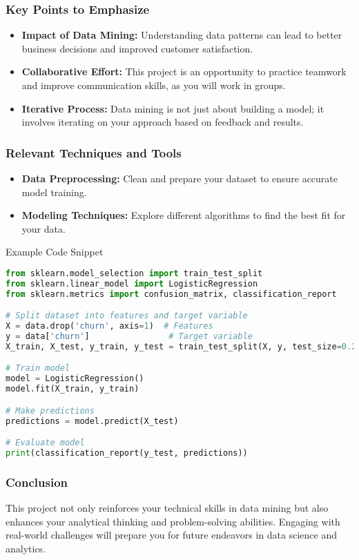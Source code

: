 \documentclass{beamer}
\begin{document}
\begin{frame}
    \frametitle{Key Points to Emphasize}
    \begin{itemize}
        \item \textbf{Impact of Data Mining:} Understanding data patterns can lead to better business decisions and improved customer satisfaction.
        \item \textbf{Collaborative Effort:} This project is an opportunity to practice teamwork and improve communication skills, as you will work in groups.
        \item \textbf{Iterative Process:} Data mining is not just about building a model; it involves iterating on your approach based on feedback and results.
    \end{itemize}
\end{frame}

\begin{frame}[fragile]
    \frametitle{Relevant Techniques and Tools}
    \begin{itemize}
        \item \textbf{Data Preprocessing:} Clean and prepare your dataset to ensure accurate model training.
        \item \textbf{Modeling Techniques:} Explore different algorithms to find the best fit for your data.
    \end{itemize}
    \begin{block}{Example Code Snippet}
    \begin{lstlisting}[language=Python]
from sklearn.model_selection import train_test_split
from sklearn.linear_model import LogisticRegression
from sklearn.metrics import confusion_matrix, classification_report

# Split dataset into features and target variable
X = data.drop('churn', axis=1)  # Features
y = data['churn']                # Target variable
X_train, X_test, y_train, y_test = train_test_split(X, y, test_size=0.2)

# Train model
model = LogisticRegression()
model.fit(X_train, y_train)

# Make predictions
predictions = model.predict(X_test)

# Evaluate model
print(classification_report(y_test, predictions))
    \end{lstlisting}
    \end{block}
\end{frame}

\begin{frame}
    \frametitle{Conclusion}
    This project not only reinforces your technical skills in data mining but also enhances your analytical thinking and problem-solving abilities. Engaging with real-world challenges will prepare you for future endeavors in data science and analytics.
\end{frame}
\end{document}
